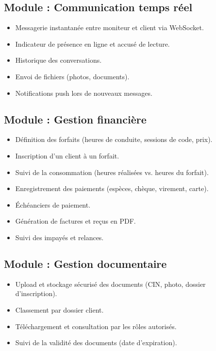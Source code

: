 \documentclass[12pt,a4paper]{article}
\begin{document}
\subsection{Module : Communication temps réel}

\begin{itemize}[leftmargin=*,itemsep=4pt]
    \item Messagerie instantanée entre moniteur et client via WebSocket.
    \item Indicateur de présence en ligne et accusé de lecture.
    \item Historique des conversations.
    \item Envoi de fichiers (photos, documents).
    \item Notifications push lors de nouveaux messages.
\end{itemize}

\subsection{Module : Gestion financière}

\begin{itemize}[leftmargin=*,itemsep=4pt]
    \item Définition des forfaits (heures de conduite, sessions de code, prix).
    \item Inscription d'un client à un forfait.
    \item Suivi de la consommation (heures réalisées vs. heures du forfait).
    \item Enregistrement des paiements (espèces, chèque, virement, carte).
    \item Échéanciers de paiement.
    \item Génération de factures et reçus en PDF.
    \item Suivi des impayés et relances.
\end{itemize}

\subsection{Module : Gestion documentaire}

\begin{itemize}[leftmargin=*,itemsep=4pt]
    \item Upload et stockage sécurisé des documents (CIN, photo, dossier d'inscription).
    \item Classement par dossier client.
    \item Téléchargement et consultation par les rôles autorisés.
    \item Suivi de la validité des documents (date d'expiration).
\end{itemize}
\end{document}
